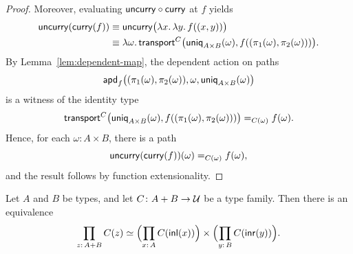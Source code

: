 \begin{proof}
    Moreover, evaluating $\mathsf{uncurry}\circ\mathsf{curry}$ at $f$ yields
    \begin{align*}
        \mathsf{uncurry}(\mathsf{curry}(f))
            &\equiv\mathsf{uncurry}
                \bigl(
                    \lambda x.\,\lambda y.\,f((x,y))
                \bigr)\\
            &\equiv\lambda\omega.\,\mathsf{transport}^C
                \bigl(
                    \mathsf{uniq}_{A\times B}(\omega),
                    f((\pi_1(\omega),\pi_2(\omega)))
                \bigr).
    \end{align*}
    By Lemma~\ref{lem:dependent-map}, the dependent action on paths
    \[
        \mathsf{apd}_f
            \bigl(
            (\pi_1(\omega),\pi_2(\omega)),
            \omega,
            \mathsf{uniq}_{A\times B}(\omega)\bigr)
    \]
    is a witness of the identity type
    \[
        \mathsf{transport}^C
            \bigl(
                \mathsf{uniq}_{A\times B}(\omega),
                f((\pi_1(\omega),\pi_2(\omega)))
            \bigr)
            \mathrel{=_{C(\omega)}}f(\omega).
    \]
    Hence, for each $\omega\colon A\times B$, there is a path
    \[
        \mathsf{uncurry}(\mathsf{curry}(f))(\omega)
        \mathrel{=_{C(\omega)}}
        f(\omega),
    \]
    and the result follows by function extensionality.
\end{proof}

\begin{thm}\fe\label{thm:universal-property-of-product-over-coproduct}
    Let\/ $A$ and\/ $B$ be types, and let\/ $C\colon A+B\to\univ$ be a type family. Then there is an equivalence
    \[
        \prod_{z\colon A+B}C(z)\simeq
            \Bigl
                (\prod_{x\colon A}C(\fun{inl}(x))
            \Bigr)
            \times
            \Bigl(
                \prod_{y\colon B}C(\fun{inr}(y))
            \Bigr).
    \]
\end{thm}

